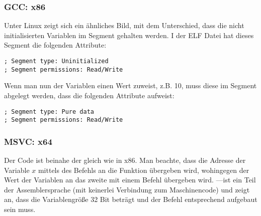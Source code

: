 

\subsubsection{GCC: x86}

Unter Linux zeigt sich ein ähnliches Bild, mit dem Unterschied, dass die nicht initialisierten Variablen im 
Segment gehalten werden. 
I der \ac{ELF} Datei hat dieses Segment die folgenden Attribute: 

\begin{lstlisting}
; Segment type: Uninitialized
; Segment permissions: Read/Write
\end{lstlisting}

Wenn man nun der Variablen einen Wert zuweist, z.B. 10, muss diese im  Segment abgelegt werden, dass die
folgenden Attribute aufweist:

\begin{lstlisting}
; Segment type: Pure data
; Segment permissions: Read/Write
\end{lstlisting}

\subsubsection{MSVC: x64}


Der Code ist beinahe der gleich wie in x86.
Man beachte, dass die Adresse der Variable $x$ mittels des Befehls \LEA an die Funktion  übergeben wird,
wohingegen der Wert der Variablen an das zweite \printf mit einem \MOV Befehl übergeben wird.
---ist ein Teil der Assemblersprache (mit keinerlei Verbindung zum Maschinencode) und zeigt an, dass die
Variablengröße 32 Bit beträgt und der \MOV Befehl entsprechend aufgebaut sein muss.


